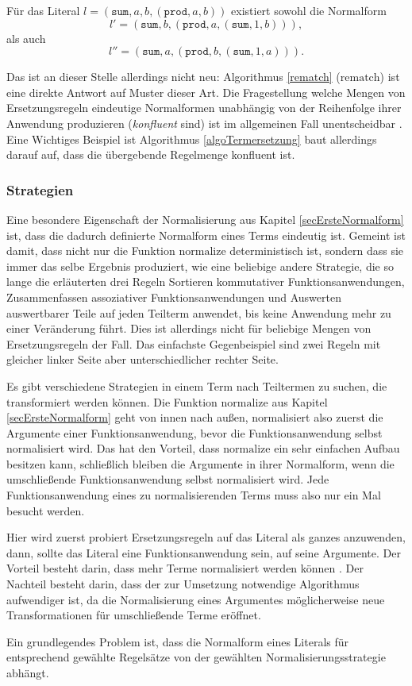 Für das Literal $l = (\texttt{sum}, a, b, (\texttt{prod}, a, b))$ existiert sowohl die Normalform 
$$l' = (\texttt{sum}, b, (\texttt{prod}, a, (\texttt{sum}, 1, b))),$$ 
als auch 
$$l'' = (\texttt{sum}, a, (\texttt{prod}, b, (\texttt{sum}, 1, a))).$$

Das ist an dieser Stelle allerdings nicht neu: Algorithmus \ref{rematch} ($\mathrm{rematch}$) ist eine direkte Antwort auf Muster dieser Art. Die Fragestellung welche Mengen von Ersetzungsregeln eindeutige Normalformen unabhängig von der Reihenfolge ihrer Anwendung produzieren (\emph{konfluent} sind) ist im allgemeinen Fall unentscheidbar \cite{KonfluenzUnentscheidbar}. Eine Wichtiges Beispiel ist 
Algorithmus \ref{algoTermersetzung} baut allerdings darauf auf, dass die übergebende Regelmenge konfluent ist.

\subsubsection{Strategien}
Eine besondere Eigenschaft der Normalisierung aus Kapitel \ref{secErsteNormalform} ist, dass die dadurch definierte Normalform eines Terms eindeutig ist. Gemeint ist damit, dass nicht nur die Funktion $\mathrm{normalize}$ deterministisch ist, sondern dass sie immer das selbe Ergebnis produziert, wie eine beliebige andere Strategie, die so lange die erläuterten drei Regeln Sortieren kommutativer Funktionsanwendungen, Zusammenfassen assoziativer Funktionsanwendungen und Auswerten auswertbarer Teile auf jeden Teilterm anwendet, bis keine Anwendung mehr zu einer Veränderung führt. Dies ist allerdings nicht für beliebige Mengen von Ersetzungsregeln der Fall. Das einfachste Gegenbeispiel sind zwei Regeln mit gleicher linker Seite aber unterschiedlicher rechter Seite.




Es gibt verschiedene Strategien in einem Term nach Teiltermen zu suchen, die transformiert werden können. Die Funktion $\mathrm{normalize}$ aus Kapitel \ref{secErsteNormalform} geht von innen nach außen, normalisiert also zuerst die Argumente einer Funktionsanwendung, bevor die Funktionsanwendung selbst normalisiert wird. Das hat den Vorteil, dass $\mathrm{normalize}$ ein sehr einfachen Aufbau besitzen kann, schließlich bleiben die Argumente in ihrer Normalform, wenn die umschließende Funktionsanwendung selbst normalisiert wird. Jede Funktionsanwendung eines zu normalisierenden Terms muss also nur ein Mal besucht werden.


Hier wird zuerst probiert Ersetzungsregeln auf das Literal als ganzes anzuwenden, dann, sollte das Literal eine Funktionsanwendung sein, auf seine Argumente. Der Vorteil besteht darin, dass mehr Terme normalisiert werden können \cite{EvalStrategien}. Der Nachteil besteht darin, dass der zur Umsetzung notwendige Algorithmus aufwendiger ist, da die Normalisierung eines Argumentes möglicherweise neue Transformationen für umschließende Terme eröffnet.

Ein grundlegendes Problem ist, dass die Normalform eines Literals für entsprechend gewählte Regelsätze von der gewählten Normalisierungsstrategie abhängt. 


















